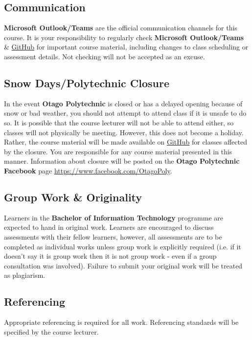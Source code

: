 \documentclass{article}
\begin{document}
\subsection*{Communication}
\textbf{Microsoft Outlook/Teams} are the official communication channels for this course. It is your responsibility to regularly check \textbf{Microsoft Outlook/Teams} \& \href{https://github.com/otago-polytechnic-bit-courses/ID721001-mobile-application-development}{GitHub} for important course material, including changes to class scheduling or assessment details. Not checking will not be accepted as an excuse.

\subsection*{Snow Days/Polytechnic Closure}
In the event \textbf{Otago Polytechnic} is closed or has a delayed opening because of snow or bad weather, you should not attempt to attend class if it is unsafe to do so. It is possible that the course lecturer will not be able to attend either, so classes will not physically be meeting. However, this does not become a holiday. Rather, the course material will be made available on \href{https://github.com/otago-polytechnic-bit-courses/ID721001-mobile-application-development}{GitHub} for classes affected by the closure. You are responsible for any course material presented in this manner. Information about closure will be posted on the \textbf{Otago Polytechnic Facebook} page \href{https://www.facebook.com/OtagoPoly}{https://www.facebook.com/OtagoPoly}.

\subsection*{Group Work \& Originality}
Learners in the \textbf{Bachelor of Information Technology} programme are expected to hand in original work. Learners are encouraged to discuss assessments with their fellow learners, however, all assessments are to be completed as individual works unless group work is explicitly required (i.e. if it doesn't say it is group work then it is not group work - even if a group consultation was involved). Failure to submit your original work will be treated as plagiarism.

\subsection*{Referencing}
Appropriate referencing is required for all work. Referencing standards will be specified by the course lecturer.
\end{document}
